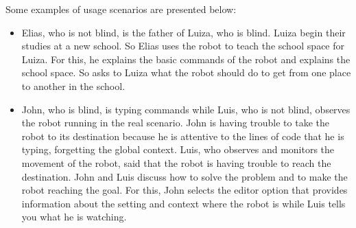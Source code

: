 Some examples of usage scenarios are presented below:

\begin{itemize}
    \item Elias, who is not blind, is the father of Luiza, who is blind. Luiza begin their studies at a new school. So Elias uses the robot to teach the school space for Luiza. For this, he explains the basic commands of the robot and explains the school space. So asks to Luiza what the robot should do to get from one place to another in the school.
    
    \item John, who is blind, is typing commands while Luis, who is not blind, observes the robot running  in the real scenario. John is having trouble to take the robot to its destination because he is attentive to the lines of code that he is typing, forgetting the global context. Luis, who observes and monitors the movement of the robot, said that the robot is having trouble to reach the destination. John and Luis discuss how to solve the problem and to make the robot reaching the goal. For this, John selects the editor option that provides information about the setting and context where the robot is while Luis tells you what he is watching.
    

\end{itemize}
